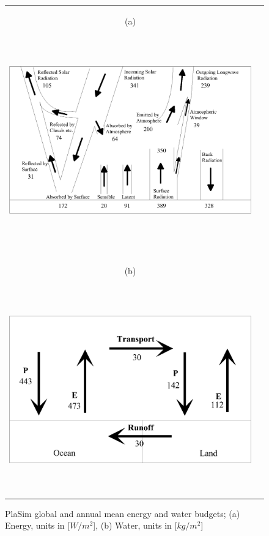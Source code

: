 \documentclass[12pt,a4paper,twoside,openright,headinclude,liststotoc,bibtotoc]{scrreprt}
\begin{document}
\begin{figure}[b]
\begin{tabular}{cc}
\begin{minipage}{1.0\textwidth}\hspace{1.15cm}\begin{scriptsize}(a)\end{scriptsize} \vspace{-0.15cm}
\begin{center}
\includegraphics[height=9.0cm]{eps/heat.eps}
\end{center}
\end{minipage}
\\
\\
\\
\begin{minipage}{1.0\textwidth}\hspace{1.15cm}\begin{scriptsize}(b)\end{scriptsize} \vspace{-0.15cm}
\begin{center}
\includegraphics[height=9.0cm]{eps/water.eps}
\end{center}
\end{minipage}
\end{tabular}
\caption[PlaSim global and annual mean energy and water budgets]{PlaSim global and annual mean energy and water budgets; (a) Energy, units in [$W/m^2$], (b) Water, units in [$kg/m^{2}$]}
\label{img:enercycle}
\end{figure}
\end{document}
